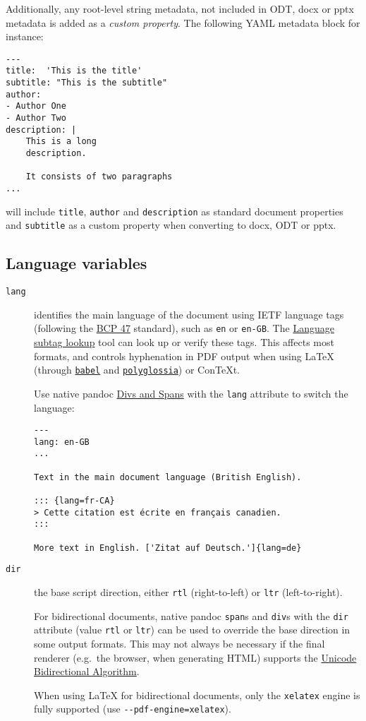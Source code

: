 \documentclass[
]{article}
\begin{document}
Additionally, any root-level string metadata, not included in ODT, docx
or pptx metadata is added as a \emph{custom property}. The following
YAML metadata block for instance:

\begin{verbatim}
---
title:  'This is the title'
subtitle: "This is the subtitle"
author:
- Author One
- Author Two
description: |
    This is a long
    description.

    It consists of two paragraphs
...
\end{verbatim}

will include \texttt{title}, \texttt{author} and \texttt{description} as
standard document properties and \texttt{subtitle} as a custom property
when converting to docx, ODT or pptx.

\hypertarget{language-variables}{%
\subsection{Language variables}\label{language-variables}}

\begin{description}
\item[\texttt{lang}]
identifies the main language of the document using IETF language tags
(following the \href{https://tools.ietf.org/html/bcp47}{BCP 47}
standard), such as \texttt{en} or \texttt{en-GB}. The
\href{https://r12a.github.io/app-subtags/}{Language subtag lookup} tool
can look up or verify these tags. This affects most formats, and
controls hyphenation in PDF output when using LaTeX (through
\href{https://ctan.org/pkg/babel}{\texttt{babel}} and
\href{https://ctan.org/pkg/polyglossia}{\texttt{polyglossia}}) or
ConTeXt.

Use native pandoc \protect\hyperlink{divs-and-spans}{Divs and Spans}
with the \texttt{lang} attribute to switch the language:

\begin{verbatim}
---
lang: en-GB
...

Text in the main document language (British English).

::: {lang=fr-CA}
> Cette citation est écrite en français canadien.
:::

More text in English. ['Zitat auf Deutsch.']{lang=de}
\end{verbatim}
\item[\texttt{dir}]
the base script direction, either \texttt{rtl} (right-to-left) or
\texttt{ltr} (left-to-right).

For bidirectional documents, native pandoc \texttt{span}s and
\texttt{div}s with the \texttt{dir} attribute (value \texttt{rtl} or
\texttt{ltr}) can be used to override the base direction in some output
formats. This may not always be necessary if the final renderer
(e.g.~the browser, when generating HTML) supports the
\href{http://www.w3.org/International/articles/inline-bidi-markup/uba-basics}{Unicode
Bidirectional Algorithm}.

When using LaTeX for bidirectional documents, only the \texttt{xelatex}
engine is fully supported (use \texttt{-\/-pdf-engine=xelatex}).
\end{description}
\end{document}
